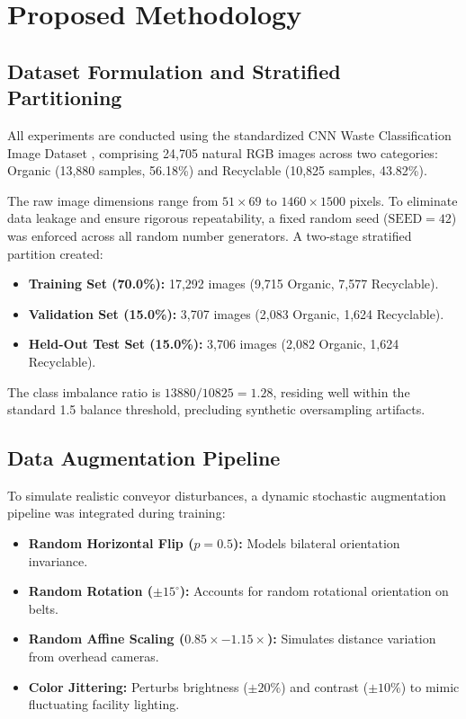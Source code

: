 \documentclass[conference]{IEEEtran}
\begin{document}
\section{Proposed Methodology}

\subsection{Dataset Formulation and Stratified Partitioning}
All experiments are conducted using the standardized CNN Waste Classification Image Dataset \cite{dataset2021}, comprising 24,705 natural RGB images across two categories: Organic (13,880 samples, 56.18\%) and Recyclable (10,825 samples, 43.82\%). 

The raw image dimensions range from $51 \times 69$ to $1460 \times 1500$ pixels. To eliminate data leakage and ensure rigorous repeatability, a fixed random seed ($\text{SEED} = 42$) was enforced across all random number generators. A two-stage stratified partition created:
\begin{itemize}
    \item \textbf{Training Set (70.0\%):} 17,292 images (9,715 Organic, 7,577 Recyclable).
    \item \textbf{Validation Set (15.0\%):} 3,707 images (2,083 Organic, 1,624 Recyclable).
    \item \textbf{Held-Out Test Set (15.0\%):} 3,706 images (2,082 Organic, 1,624 Recyclable).
\end{itemize}
The class imbalance ratio is $13880 / 10825 = 1.28$, residing well within the standard 1.5 balance threshold, precluding synthetic oversampling artifacts.

\subsection{Data Augmentation Pipeline}
To simulate realistic conveyor disturbances, a dynamic stochastic augmentation pipeline was integrated during training:
\begin{itemize}
    \item \textbf{Random Horizontal Flip ($p=0.5$):} Models bilateral orientation invariance.
    \item \textbf{Random Rotation ($\pm 15^\circ$):} Accounts for random rotational orientation on belts.
    \item \textbf{Random Affine Scaling ($0.85 \times - 1.15 \times$):} Simulates distance variation from overhead cameras.
    \item \textbf{Color Jittering:} Perturbs brightness ($\pm 20\%$) and contrast ($\pm 10\%$) to mimic fluctuating facility lighting.
\end{itemize}
\end{document}
